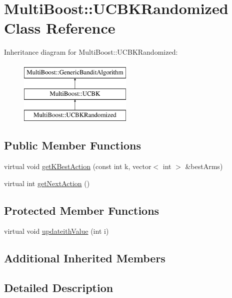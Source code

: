 \hypertarget{classMultiBoost_1_1UCBKRandomized}{\section{Multi\-Boost\-:\-:U\-C\-B\-K\-Randomized Class Reference}
\label{classMultiBoost_1_1UCBKRandomized}
}
Inheritance diagram for Multi\-Boost\-:\-:U\-C\-B\-K\-Randomized\-:\begin{figure}[H]
\begin{center}
\leavevmode
\includegraphics[height=3.000000cm]{classMultiBoost_1_1UCBKRandomized}
\end{center}
\end{figure}
\subsection*{Public Member Functions}
\begin{DoxyCompactItemize}
\item 
virtual void \hyperlink{classMultiBoost_1_1UCBKRandomized_a5865525e5e08cb59d0c290e2def01792}{get\-K\-Best\-Action} (const int k, vector$<$ int $>$ \&best\-Arms)
\item 
virtual int \hyperlink{classMultiBoost_1_1UCBKRandomized_a18a1ea7d59ee424b21f3bca04c6bf227}{get\-Next\-Action} ()
\end{DoxyCompactItemize}
\subsection*{Protected Member Functions}
\begin{DoxyCompactItemize}
\item 
virtual void \hyperlink{classMultiBoost_1_1UCBKRandomized_ae13fd9d7f2abe28a3f1e6aa8ff76c1ef}{updateith\-Value} (int i)
\end{DoxyCompactItemize}
\subsection*{Additional Inherited Members}


\subsection{Detailed Description}


